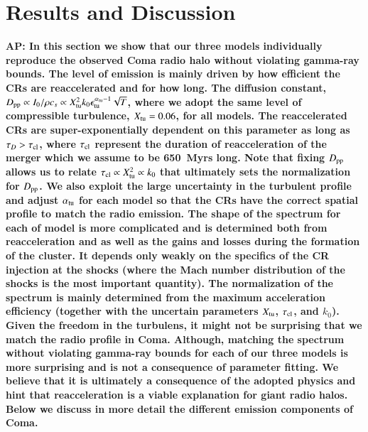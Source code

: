 \documentclass[a4paper,fleqn,usenatbib]{mnras}
\def\AP#1{{\bf  AP: #1}}
\begin{document}
\section{Results and Discussion} 
\label{sec:results}
\AP{In this section we show that our three models individually
  reproduce the observed Coma radio halo without violating gamma-ray
  bounds. The level of emission is mainly driven by how efficient the
  CRs are reaccelerated and for how long. The diffusion constant,
  $D_{\mathrm{pp}}\propto I_0/\rho c_s \propto
  X_{\mathrm{tu}}^2k_0\epsilon_{\mathrm{tu}}^{\alpha_{\mathrm{tu}}-1}\sqrt{T}$, where
  we adopt the same level of compressible turbulence,
  $X_{\mathrm{tu}}=0.06$, for all models. The reaccelerated CRs are
  super-exponentially dependent on this parameter as long as $\tau_D >
  \tau_{\mathrm{cl}}$, where $\tau_{\mathrm{cl}}$ represent the duration of
  reacceleration of the merger which we assume to be 650~Myrs
  long. Note that  fixing $D_{\mathrm{pp}}$ allows us to relate
  $\tau_{\mathrm{cl}} \propto X_{\mathrm{tu}}^2 \propto k_0$ that ultimately sets
  the normalization for $D_{\mathrm{pp}}$. We also exploit the large
  uncertainty in the turbulent profile and adjust $\alpha_{\mathrm{tu}}$
  for each model so that the CRs have the correct spatial profile to
  match the radio emission. The shape of the spectrum for each of
  model is more complicated and is determined both from reacceleration
  and as well as the gains and losses during the formation of the
  cluster. It depends only weakly on the specifics of the CR injection
  at the shocks (where the Mach number distribution of the shocks is
  the most important quantity). The normalization of the spectrum is
  mainly determined from the maximum acceleration efficiency (together
  with the uncertain parameters $X_{\mathrm{tu}}$, $\tau_{\mathrm{cl}}$, and
  $k_0$). Given the freedom in the turbulens, it might not be
  surprising that we match the radio profile in Coma. Although,
  matching the spectrum without violating gamma-ray bounds for each of
  our three models is more surprising and is not a consequence of
  parameter fitting. We believe that it is ultimately a consequence of
  the adopted physics and hint that reacceleration is a viable
  explanation for giant radio halos. Below we discuss in more detail
  the different emission components of Coma.}
\end{document}
